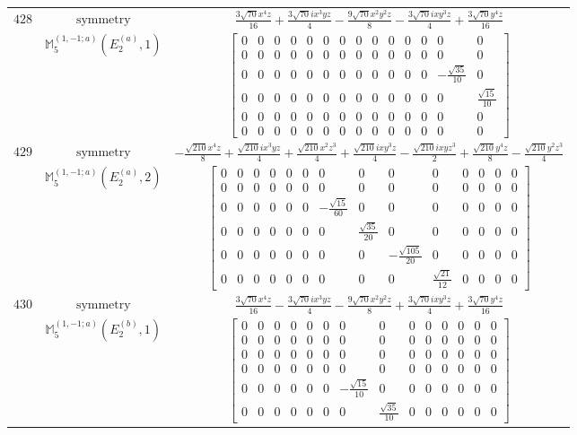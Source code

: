 \documentclass[fleqn,8pt,landscape]{jsarticle}
\begin{document}
\begin{longtable}{ccc}
$ 428 $ & $ \text{symmetry} $ & $ \frac{3 \sqrt{70} x^{4} z}{16} + \frac{3 \sqrt{70} i x^{3} y z}{4} - \frac{9 \sqrt{70} x^{2} y^{2} z}{8} - \frac{3 \sqrt{70} i x y^{3} z}{4} + \frac{3 \sqrt{70} y^{4} z}{16} $ \\
$  $ & $ \mathbb{M}_{5}^{(1,-1;a)}(E_{2}^{(a)},1) $ & $ \begin{bmatrix} 0 & 0 & 0 & 0 & 0 & 0 & 0 & 0 & 0 & 0 & 0 & 0 & 0 & 0 \\ 0 & 0 & 0 & 0 & 0 & 0 & 0 & 0 & 0 & 0 & 0 & 0 & 0 & 0 \\ 0 & 0 & 0 & 0 & 0 & 0 & 0 & 0 & 0 & 0 & 0 & 0 & - \frac{\sqrt{35}}{10} & 0 \\ 0 & 0 & 0 & 0 & 0 & 0 & 0 & 0 & 0 & 0 & 0 & 0 & 0 & \frac{\sqrt{15}}{10} \\ 0 & 0 & 0 & 0 & 0 & 0 & 0 & 0 & 0 & 0 & 0 & 0 & 0 & 0 \\ 0 & 0 & 0 & 0 & 0 & 0 & 0 & 0 & 0 & 0 & 0 & 0 & 0 & 0 \end{bmatrix} $ \\ \hline
$ 429 $ & $ \text{symmetry} $ & $ - \frac{\sqrt{210} x^{4} z}{8} + \frac{\sqrt{210} i x^{3} y z}{4} + \frac{\sqrt{210} x^{2} z^{3}}{4} + \frac{\sqrt{210} i x y^{3} z}{4} - \frac{\sqrt{210} i x y z^{3}}{2} + \frac{\sqrt{210} y^{4} z}{8} - \frac{\sqrt{210} y^{2} z^{3}}{4} $ \\
$  $ & $ \mathbb{M}_{5}^{(1,-1;a)}(E_{2}^{(a)},2) $ & $ \begin{bmatrix} 0 & 0 & 0 & 0 & 0 & 0 & 0 & 0 & 0 & 0 & 0 & 0 & 0 & 0 \\ 0 & 0 & 0 & 0 & 0 & 0 & 0 & 0 & 0 & 0 & 0 & 0 & 0 & 0 \\ 0 & 0 & 0 & 0 & 0 & 0 & - \frac{\sqrt{15}}{60} & 0 & 0 & 0 & 0 & 0 & 0 & 0 \\ 0 & 0 & 0 & 0 & 0 & 0 & 0 & \frac{\sqrt{35}}{20} & 0 & 0 & 0 & 0 & 0 & 0 \\ 0 & 0 & 0 & 0 & 0 & 0 & 0 & 0 & - \frac{\sqrt{105}}{20} & 0 & 0 & 0 & 0 & 0 \\ 0 & 0 & 0 & 0 & 0 & 0 & 0 & 0 & 0 & \frac{\sqrt{21}}{12} & 0 & 0 & 0 & 0 \end{bmatrix} $ \\ \hline
$ 430 $ & $ \text{symmetry} $ & $ \frac{3 \sqrt{70} x^{4} z}{16} - \frac{3 \sqrt{70} i x^{3} y z}{4} - \frac{9 \sqrt{70} x^{2} y^{2} z}{8} + \frac{3 \sqrt{70} i x y^{3} z}{4} + \frac{3 \sqrt{70} y^{4} z}{16} $ \\
$  $ & $ \mathbb{M}_{5}^{(1,-1;a)}(E_{2}^{(b)},1) $ & $ \begin{bmatrix} 0 & 0 & 0 & 0 & 0 & 0 & 0 & 0 & 0 & 0 & 0 & 0 & 0 & 0 \\ 0 & 0 & 0 & 0 & 0 & 0 & 0 & 0 & 0 & 0 & 0 & 0 & 0 & 0 \\ 0 & 0 & 0 & 0 & 0 & 0 & 0 & 0 & 0 & 0 & 0 & 0 & 0 & 0 \\ 0 & 0 & 0 & 0 & 0 & 0 & 0 & 0 & 0 & 0 & 0 & 0 & 0 & 0 \\ 0 & 0 & 0 & 0 & 0 & 0 & - \frac{\sqrt{15}}{10} & 0 & 0 & 0 & 0 & 0 & 0 & 0 \\ 0 & 0 & 0 & 0 & 0 & 0 & 0 & \frac{\sqrt{35}}{10} & 0 & 0 & 0 & 0 & 0 & 0 \end{bmatrix} $ \\ \hline

\end{longtable}
\end{document}
